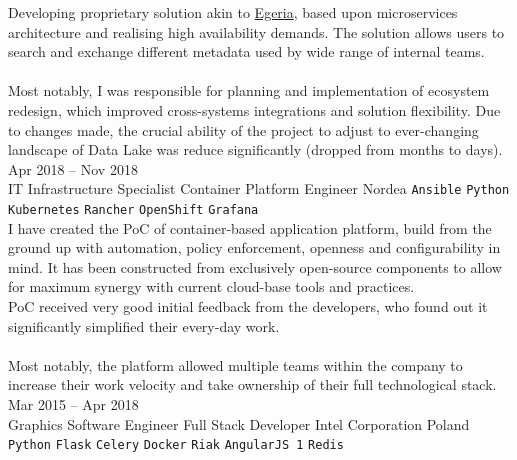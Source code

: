 \documentclass[9pt]{style/developercv}
\begin{document}
\begin{entrylist}
{			Developing proprietary solution akin to 
			\href{https://egeria.odpi.org}{Egeria}, based upon microservices 
			architecture and realising high availability demands. The solution
			allows users to search and exchange different metadata used by wide
			range of internal teams.\\ \\
			Most notably, I was responsible for planning and implementation of 
			ecosystem redesign, which improved cross-systems integrations and 
			solution flexibility. Due to changes made, the crucial ability of 
			the project to adjust to ever-changing landscape of Data Lake was
			reduce significantly (dropped from months to days). \\
		}
	\entry
		{Apr 2018 -- Nov 2018\\\footnotesize{IT Infrastructure Specialist}}
		{Container Platform Engineer}
		{Nordea}
		{
			\texttt{Ansible}\slashsep
			\texttt{Python}\slashsep
			\texttt{Kubernetes}\slashsep
			\texttt{Rancher}\slashsep
			\texttt{OpenShift}\slashsep
			\texttt{Grafana}\\

			I have created the PoC of container-based application platform, build 
			from the ground up with automation, policy enforcement, 
			openness and configurability in mind. 
			It has been constructed from exclusively open-source components to
			allow for maximum synergy with current cloud-base 
			tools and practices. \\
			PoC received very good initial feedback from the developers, 
			who found out it significantly simplified their every-day work.\\ \\
			Most notably, the platform allowed multiple teams within the company
			to increase their work velocity and take ownership of their full technological
			stack.
		}
	\entry
		{Mar 2015 -- Apr 2018\\\footnotesize{Graphics Software Engineer}}
		{Full Stack Developer}
		{Intel Corporation Poland}
		{
			\texttt{Python}\slashsep
			\texttt{Flask}\slashsep
			\texttt{Celery}\slashsep
			\texttt{Docker}\slashsep
			\texttt{Riak}\slashsep
			\texttt{AngularJS 1}\slashsep
			\texttt{Redis}\\

}
\end{entrylist}
\end{document}
